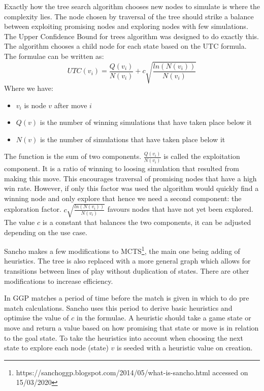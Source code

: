 \documentclass[a4paper,12pt]{report}
\begin{document}
Exactly how the tree search algorithm chooses new nodes to simulate is where the complexity lies. The node chosen by traversal of the tree should strike a balance between exploiting promising nodes and exploring nodes with few simulations. The Upper Confidence Bound for trees algorithm was designed to do exactly this\cite{Kocsis/UCT}. The algorithm chooses a child node for each state based on the UTC formula. The formulae can be written as: \[UTC(v_i) = \frac{Q(v_i)}{N(v_i)} + c\sqrt{\frac{ln(N(v_i))}{N(v_i)}}\] Where we have:
\begin{itemize}
\item $v_i$ is node $v$ after move $i$
\item $Q(v)$ is the number of winning simulations that have taken place below it
\item $N(v)$ is the number of simulations that have taken place below it
\end{itemize}
The function is the sum of two components. $\frac{Q(v_i)}{N(v_i)}$ is called the exploitation component. It is a ratio of winning to loosing simulation that resulted from making this move. This encourages traversal of promising nodes that have a high win rate. However, if only this factor was used the algorithm would quickly find a winning node and only explore that hence we need a second component: the exploration factor. $c\sqrt{\frac{ln(N(v_i))}{N(v_i)}}$ favours nodes that have not yet been explored. The value $c$ is a constant that balances the two components, it can be adjusted depending on the use case.

Sancho makes a few modifications to MCTS\footnote{https://sanchoggp.blogspot.com/2014/05/what-is-sancho.html accessed on 15/03/2020}, the main one being adding of heuristics. The tree is also replaced with a more general graph which allows for transitions between lines of play without duplication of states. There are other modifications to increase efficiency.

In GGP matches a period of time before the match is given in which to do pre match calculations. Sancho uses this period to derive basic heuristics and optimise the value of $c$ in the formulae. A heuristic should take a game state or move and return a value based on how promising that state or move is in relation to the goal state. To take the heuristics into account when choosing the next state to explore each node (state) $v$ is seeded with a heuristic value on creation.
\end{document}
